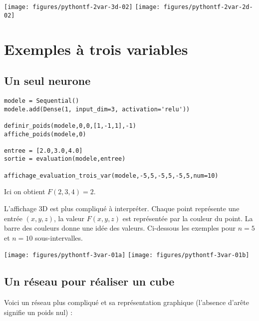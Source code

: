 \documentclass[11pt,class=report,crop=false]{standalone}
\begin{document}
\begin{center}
\texttt{[image: figures/pythontf-2var-3d-02]}
\texttt{[image: figures/pythontf-2var-2d-02]}
\end{center}

\section{Exemples à trois variables}

\subsection{Un seul neurone}



\begin{lstlisting}
modele = Sequential()
modele.add(Dense(1, input_dim=3, activation='relu'))

definir_poids(modele,0,0,[1,-1,1],-1)
affiche_poids(modele,0)  

entree = [2.0,3.0,4.0]
sortie = evaluation(modele,entree)

affichage_evaluation_trois_var(modele,-5,5,-5,5,-5,5,num=10)
\end{lstlisting}

Ici on obtient $F(2,3,4) = 2$.

L'affichage 3D est plus compliqué à interpréter. Chaque point représente une entrée $(x,y,z)$, la valeur $F(x,y,z)$ est représentée par la couleur du point.
La barre des couleurs donne une idée des valeurs. Ci-dessous les exemples pour $n = 5$ et $n= 10$ sous-intervalles.

\begin{center}
\texttt{[image: figures/pythontf-3var-01a]}
\texttt{[image: figures/pythontf-3var-01b]}
\end{center}
\subsection{Un réseau pour réaliser un cube}



Voici un réseau plus compliqué et sa représentation graphique (l'absence d'arête signifie un poids nul) :
\end{document}

